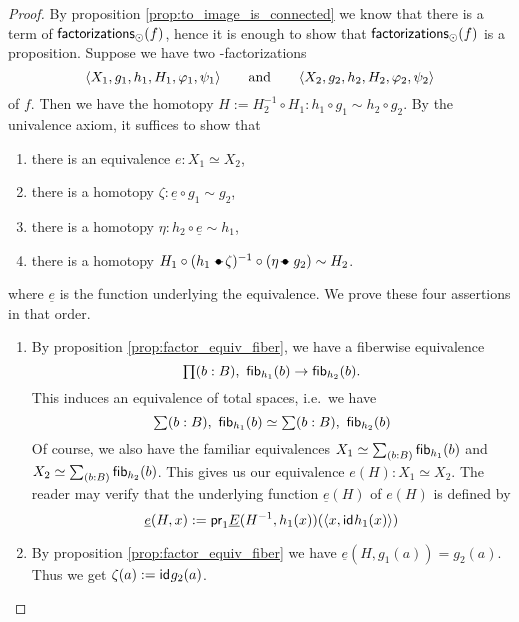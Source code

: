 \begin{proof}
By proposition \ref{prop:to_image_is_connected} we know that there is a term of $\mathsf{factorizations}_{\odot}(f)$, hence it is enough to
show that $\mathsf{factorizations}_{\odot}(f)$ is a proposition. Suppose we have two \modal-factorizations
\begin{equation*}
{\langle X_1,g_1,h_1,H_1,\varphi_1,\psi_1\rangle}\qquad\text{and}\qquad{\langle X_2,g_2,h_2,H_2,\varphi_2,\psi_2\rangle}
\end{equation*}
of $f$. Then we have the homotopy $H:=H_2^{-1}\circ H_1:h_1\circ g_1\sim h_2\circ g_2$. By the univalence axiom, it suffices to show that
\begin{enumerate}
\item there is an equivalence $e:X_1\simeq X_2$,
\item there is a homotopy $\zeta:\underline{e}\circ g_1\sim g_2$,
\item there is a homotopy $\eta:h_2\circ\underline{e}\sim h_1$,
\item there is a homotopy $H_1 \circ(h_1\leftwhisker\zeta)^{-1}\circ(\eta\rightwhisker g_2)\sim H_2$.
\end{enumerate}
where $\underline{e}$ is the function underlying the equivalence. We prove these four assertions in that order.
\begin{enumerate}
\item By proposition \ref{prop:factor_equiv_fiber}, we have a fiberwise equivalence
\begin{equation*}
\prd{b:B} \hfib{h_1}b\to\hfib{h_2}b.
\end{equation*}
This induces an equivalence of total spaces, i.e.\ we have
\begin{equation*}
\sm{b:B} \hfib{h_1}b\simeq\sm{b:B}\hfib{h_2}b
\end{equation*}
Of course, we also have the familiar equivalences $X_1\simeq\sm{b:B}\hfib{h_1}b$ and $X_2\simeq\sm{b:B}
\hfib{h_2}b$. This gives us our equivalence $e(H):X_1\simeq X_2$. The reader may verify that the underlying function
$\underline{e}(H)$ of $e(H)$ is defined by
\begin{equation*}
\underline{e}(H,x):=\mathsf{pr}_{1}\underline{E}(H^{-1},h_1(x))({\langle x,\mathsf{id}_{}{h_1(x)}\rangle})
\end{equation*}
\item By proposition \ref{prop:factor_equiv_fiber} we have $\underline{e}(H,g_1(a))=g_2(a)$. Thus we get $\zeta(a):=\mathsf{id}_{}{g_2(a)}$. 

\end{enumerate}
\end{proof}
